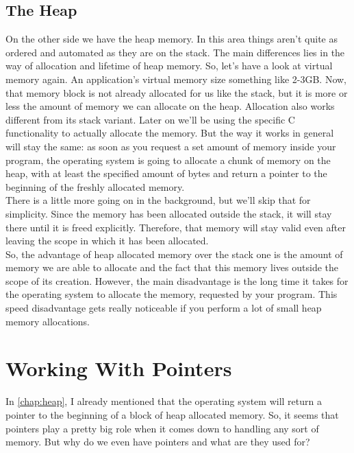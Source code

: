 \documentclass{article}
\begin{document}
  \subsection{The Heap}
  \label{chap:heap}
  On the other side we have the heap memory.
  In this area things aren't quite as ordered and automated as they are on the stack.
  The main differences lies in the way of allocation and lifetime of heap memory.
  So, let's have a look at virtual memory again.
  An application's virtual memory size something like 2-3GB.
  Now, that memory block is not already allocated for us like the stack, but it is more or less the amount of memory we can allocate on the heap.
  Allocation also works different from its stack variant.
  Later on we'll be using the specific C functionality to actually allocate the memory.
  But the way it works in general will stay the same: as soon as you request a set amount of memory inside your program, the operating system is going to allocate a chunk of memory on the heap, with at least the specified amount of bytes and return a pointer to the beginning of the freshly allocated memory.
  \\There is a little more going on in the background, but we'll skip that for simplicity.
  Since the memory has been allocated outside the stack, it will stay there until it is freed explicitly.
  Therefore, that memory will stay valid even after leaving the scope in which it has been allocated.
  \\So, the advantage of heap allocated memory over the stack one is the amount of memory we are able to allocate and the fact that this memory lives outside the scope of its creation.
  However, the main disadvantage is the long time it takes for the operating system to allocate the memory, requested by your program.
  This speed disadvantage gets really noticeable if you perform a lot of small heap memory allocations.
  \section{Working With Pointers}
  In \autoref{chap:heap}, I already mentioned that the operating system will return a pointer to the beginning of a block of heap allocated memory.
  So, it seems that pointers play a pretty big role when it comes down to handling any sort of memory.
  But why do we even have pointers and what are they used for?
\end{document}
